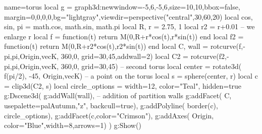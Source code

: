 \documentclass[border=5pt]{standalone}%
\begin{document}
\begin{luadraw}{name=torus}
local g = graph3d:new{window={-5,6,-5,6},size={10,10},bbox=false, margin={0,0,0,0},bg="lightgray",viewdir=perspective("central",30,60,20)}
local cos, sin, pi = math.cos, math.sin, math.pi
local R, r = 2.75, 1
local r2 = r+0.01 -- we enlarge r
local f = function(t) return M(0,R+r*cos(t),r*sin(t)) end
local f2 = function(t) return M(0,R+r2*cos(t),r2*sin(t)) end 
local C, wall = rotcurve(f,-pi,pi,{Origin,vecK}, 360,0, {grid={30,45},addwall=2})
local C2  = rotcurve(f2,-pi,pi,{Origin,vecK}, 360,0, {grid={30,45}}) -- second torus
local center = rotate3d( f(pi/2), -45, {Origin,vecK}) -- a point on the torus
local s = sphere(center, r)
local c = clip3d(C2, s)
local circle_options = {width=12, color="Teal", hidden=true}
g:Dscene3d(
    g:addWall(wall), -- addition of partition walls
    g:addFacet( C, {usepalette={palAutumn,"z"}, backcull=true}),
    g:addPolyline( border(c), circle_options),
    g:addFacet(c,{color="Crimson"}),    
    g:addAxes( Origin, {color="Blue",width=8,arrows=1})
)
g:Show()
\end{luadraw}
\end{document}
